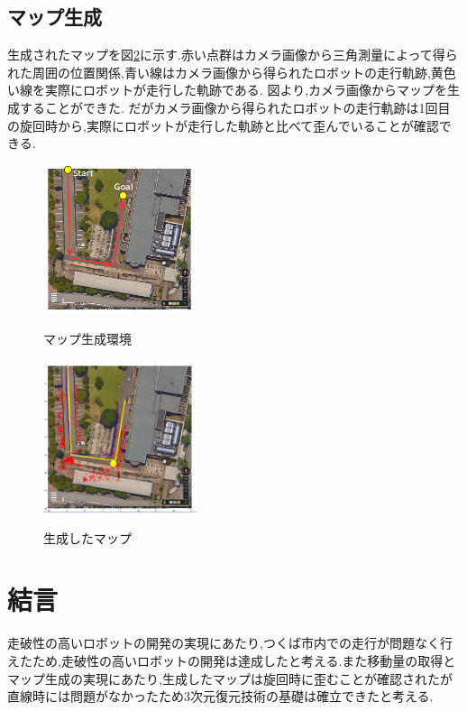 \documentclass[twocolumn,11pt]{sotsuken_abst}
\begin{document}
\subsection{マップ生成}
生成されたマップを図\ref{fig:mapp}に示す.赤い点群はカメラ画像から三角測量によって得られた周囲の位置関係,青い線はカメラ画像から得られたロボットの走行軌跡,黄色い線を実際にロボットが走行した軌跡である.
図より,カメラ画像からマップを生成することができた.
だがカメラ画像から得られたロボットの走行軌跡は1回目の旋回時から,実際にロボットが走行した軌跡と比べて歪んでいることが確認できる.

\begin{figure}[htp]
 \begin{center}
  \includegraphics[width=45mm]{1.png}
 　\caption{マップ生成環境}
  \label{fig:map}%
 \end{center}
\end{figure}


\begin{figure}[htp]
 \begin{center}
  \includegraphics[width=45mm]{2.png}
 　\caption{生成したマップ}
  \label{fig:mapp}%
 \end{center}
\end{figure}

\section{結言}
走破性の高いロボットの開発の実現にあたり,つくば市内での走行が問題なく行えたため,走破性の高いロボットの開発は達成したと考える.また移動量の取得とマップ生成の実現にあたり,生成したマップは旋回時に歪むことが確認されたが直線時には問題がなかったため3次元復元技術の基礎は確立できたと考える.
\end{document}

